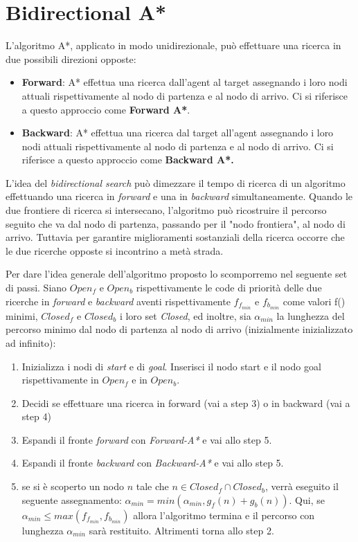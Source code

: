 \documentclass[11pt]{book}
\begin{document}
\section{Bidirectional A*}
\label{sec:bidirectional}
\par{L'algoritmo A*, applicato in modo unidirezionale, pu\`o effettuare una ricerca in due possibili direzioni opposte:
\begin{itemize}
\item \textbf{Forward}: A* effettua una ricerca dall'agent al target assegnando i loro nodi attuali rispettivamente al nodo di partenza e al nodo di arrivo. Ci si riferisce a questo approccio come \textbf{Forward A*}.
\item \textbf{Backward}: A* effettua una ricerca dal target all'agent assegnando i loro nodi attuali rispettivamente al nodo di partenza e al nodo di arrivo. Ci si riferisce a questo approccio come \textbf{Backward A*.}
\end{itemize}}
\par{
L'idea del \emph{bidirectional search} pu\`o dimezzare il tempo di ricerca di un algoritmo effettuando una ricerca in \emph{forward} e una in \emph{backward} simultaneamente. Quando le due frontiere di ricerca si intersecano, l'algoritmo pu\`o ricostruire il percorso seguito che va dal nodo di partenza, passando per il "nodo frontiera", al nodo di arrivo. Tuttavia per garantire miglioramenti sostanziali della ricerca occorre che le due ricerche opposte si incontrino a met\`a strada.}
\par{Per dare l'idea generale dell'algoritmo proposto lo scomporremo nel seguente set di passi. Siano \emph{$Open_{f}$} e \emph{$Open_{b}$} rispettivamente le code di priorit\`a delle due ricerche in \emph{forward} e \emph{backward} aventi rispettivamente $f_{f_{min}}$ e $f_{b_{min}}$ come valori f() minimi, \emph{$Closed_f$} e \emph{$Closed_b$} i loro set \emph{Closed}, ed inoltre, sia $\alpha_{min}$ la lunghezza del percorso minimo dal nodo di partenza al nodo di arrivo (inizialmente inizializzato ad infinito):

\begin{enumerate}
\item Inizializza i nodi di \emph{start} e di \emph{goal}. Inserisci il nodo start e il nodo goal rispettivamente in \emph{$Open_f$} e in \emph{$Open_b$}.
\item Decidi se effettuare una ricerca in forward (vai a step 3) o in backward (vai a step 4)
\item Espandi il fronte \emph{forward} con \emph{Forward-A*} e vai allo step 5.
\item Espandi il fronte \emph{backward} con \emph{Backward-A*} e vai allo step 5.
\item se si \`e scoperto un nodo $n$ tale che $n \in Closed_f \cap Closed_b$, verr\`a eseguito il seguente assegnamento:  $\alpha_{min} = min(\alpha_{min}, g_{f}(n) + g_{b}(n))$. Qui, se $\alpha_{min} \leq max(f_{f_{min}}, f_{b_{min}})$ allora l'algoritmo termina e il percorso con lunghezza $\alpha_{min}$ sar\`a restituito. 
Altrimenti torna allo step 2.
\end{enumerate}

}
\end{document}
